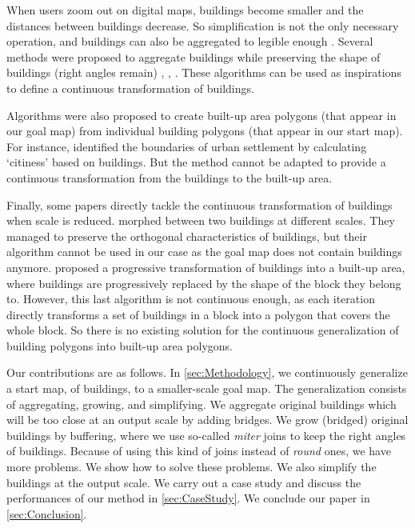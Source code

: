 When users zoom out on digital maps, 
buildings become smaller and the distances between buildings decrease. So 
simplification is not the only necessary operation, and buildings can also be 
aggregated to legible enough \cite{Weibel1997}. Several methods were proposed 
to aggregate buildings while preserving the shape of buildings (right angles 
remain) \cite{Regnauld2001}, \cite{RegnauldRevell07}, \cite{Damen2008}. These 
algorithms can be used as inspirations to define a continuous transformation of 
buildings.

Algorithms were also proposed to create built-up area polygons (that appear in 
our goal map) from individual building polygons (that appear in our start map). 
For instance, \citet{Chaudhry2008} identified the boundaries of urban 
settlement by calculating `citiness' based on buildings. But the method cannot 
be adapted to provide a continuous transformation from the buildings to the 
built-up area.

Finally, some papers directly tackle the continuous transformation of buildings 
when scale is reduced. \citet{Li2017_Building} morphed between two buildings at 
different scales.
They managed to preserve the orthogonal characteristics of buildings, but their 
algorithm cannot be used in our case as the goal map does not contain buildings 
anymore. \citet{Touya17b} proposed a progressive transformation of buildings 
into a built-up area, where buildings are progressively replaced by the shape 
of the block they belong to. However, this last algorithm is not continuous 
enough, as each iteration directly transforms a set of buildings in a block 
into a polygon that covers the whole block. So there is no existing solution 
for the continuous generalization of building polygons into built-up area 
polygons.


Our contributions are as follows.
In \sect\ref{sec:Methodology},
we continuously generalize a start map, of buildings, 
to a smaller-scale goal map.
The generalization consists of aggregating, growing, and simplifying.
We aggregate original buildings which will be too close at an output scale 
by adding bridges.
We grow (bridged) original buildings by buffering,
where we use so-called \emph{miter} joins to keep the right angles of buildings.
Because of using this kind of joins instead of \emph{round} ones,
we have more problems.
We show how to solve these problems.
We also simplify the buildings at the output scale.
We carry out a case study 
and discuss the performances of our method in \sect\ref{sec:CaseStudy}.
We conclude our paper in \sect\ref{sec:Conclusion}.



